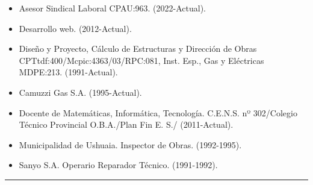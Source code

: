 \documentclass[a4paper,oneside,11pt]{article}
\begin{document}
\begin{multicols}{2} 
\begin{itemize}
    \item Asesor Sindical Laboral CPAU:963. (2022-Actual).
    \item Desarrollo web. (2012-Actual).
    \item Diseño y Proyecto, Cálculo de Estructuras y Dirección de Obras CPTtdf:400/Mcpic:4363/03/RPC:081, Inst. Esp., Gas y Eléctricas MDPE:213. (1991-Actual).
    \item Camuzzi Gas S.A. (1995-Actual).
    \item Docente de Matemáticas, Informática, Tecnología. C.E.N.S. nº 302/Colegio Técnico Provincial O.B.A./Plan Fin E. S./ (2011-Actual).
    \item Municipalidad de Ushuaia. Inspector de Obras. (1992-1995).
    \item Sanyo S.A. Operario Reparador Técnico. (1991-1992).
\end{itemize}
\end{multicols}
\hrule
\end{document}

